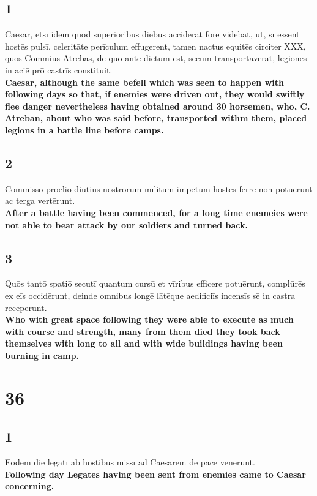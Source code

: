 \documentclass{article}
\begin{document}
\subsection*{1}
Caesar, etsī idem quod superiōribus diēbus acciderat fore vidēbat, ut, sī essent hostēs pulsī, celeritāte perīculum effugerent, tamen nactus equitēs circiter XXX, quōs Commius Atrēbās, dē quō ante dictum est, sēcum transportāverat, legiōnēs in aciē prō castrīs constituit.  \\
\textbf{Caesar, although the same befell which was seen to happen with following days so that, if enemies were driven out, they would swiftly flee danger nevertheless having obtained around 30 horsemen, who, C. Atreban, about who was said before, transported withm them, placed legions in a battle line before camps.}

\subsection*{2}
Commissō proeliō diutius nostrōrum mīlitum impetum hostēs ferre non potuērunt ac terga vertērunt.  \\
\textbf{After a battle having been commenced, for a long time enemeies were not able to bear attack by our soldiers and turned back.}

\subsection*{3}
Quōs tantō spatiō secutī quantum cursū et vīribus efficere potuērunt, complūrēs ex eīs occidērunt, deinde omnibus longē lātēque aedificiīs incensīs sē in castra recēpērunt. \\
\textbf{Who with great space following they were able to execute as much with course and strength, many from them died they took back themselves with long to all and with wide buildings having been burning in camp.}


\section*{36}
\subsection*{1}
Eōdem diē lēgātī ab hostibus missī ad Caesarem dē pace vēnērunt.\\
\textbf{Following day Legates having been sent from enemies came to Caesar concerning.}
\end{document}
